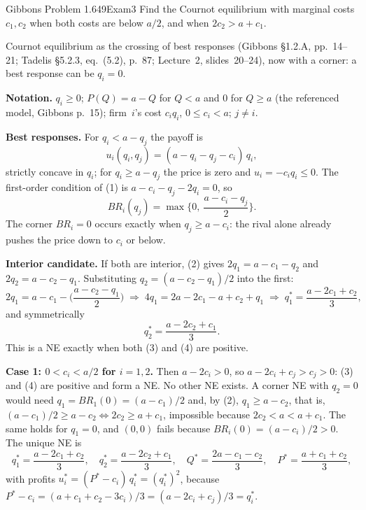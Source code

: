 \begin{exsol}{Gibbons Problem 1.6}{49}{Exam}{3}
\asked Find the Cournot equilibrium with marginal costs $c_1, c_2$ when both costs are below $a/2$, and when $2c_2 > a + c_1$.

\method Cournot equilibrium as the crossing of best responses (Gibbons \S1.2.A, pp.~14--21;
Tadelis \S5.2.3, eq.~(5.2), p.~87; Lecture~2, slides~20--24), now with a corner: a best response
can be $q_i = 0$.

\solution
\textbf{Notation.} $q_i \ge 0$; $P(Q) = a - Q$ for $Q < a$ and $0$ for $Q \ge a$ (the referenced
model, Gibbons p.~15); firm~$i$'s cost $c_i q_i$, $0 \le c_i < a$; $j \ne i$.

\textbf{Best responses.} For $q_i < a - q_j$ the payoff is
\[
  u_i(q_i, q_j) = (a - q_i - q_j - c_i)\,q_i , \tag{1}
\]
strictly concave in $q_i$; for $q_i \ge a - q_j$ the price is zero and $u_i = -c_i q_i \le 0$. The
first-order condition of (1) is $a - c_i - q_j - 2q_i = 0$, so
\[
  BR_i(q_j) = \max\Big\{0,\ \frac{a - c_i - q_j}{2}\Big\}. \tag{2}
\]
The corner $BR_i = 0$ occurs exactly when $q_j \ge a - c_i$: the rival alone already pushes the
price down to $c_i$ or below.

\textbf{Interior candidate.} If both are interior, (2) gives
$2q_1 = a - c_1 - q_2$ and $2q_2 = a - c_2 - q_1$. Substituting $q_2 = (a - c_2 - q_1)/2$ into the
first:
\[
  2q_1 = a - c_1 - \Big(\frac{a - c_2 - q_1}{2}\Big)
  \;\Longrightarrow\; 4q_1 = 2a - 2c_1 - a + c_2 + q_1
  \;\Longrightarrow\; q_1^* = \frac{a - 2c_1 + c_2}{3}, \tag{3}
\]
and symmetrically
\[
  q_2^* = \frac{a - 2c_2 + c_1}{3}. \tag{4}
\]
This is a NE exactly when both (3) and (4) are positive.

\textbf{Case 1: $0 < c_i < a/2$ for $i = 1,2$.} Then $a - 2c_i > 0$, so
$a - 2c_i + c_j > c_j > 0$: (3) and (4) are positive and form a NE. No other NE exists. A corner
NE with $q_2 = 0$ would need $q_1 = BR_1(0) = (a - c_1)/2$ and, by (2), $q_1 \ge a - c_2$, that is,
$(a - c_1)/2 \ge a - c_2 \iff 2c_2 \ge a + c_1$, impossible because $2c_2 < a < a + c_1$. The same
holds for $q_1 = 0$, and $(0,0)$ fails because $BR_i(0) = (a - c_i)/2 > 0$. The unique NE is
\[
  q_1^* = \frac{a - 2c_1 + c_2}{3}, \quad q_2^* = \frac{a - 2c_2 + c_1}{3}, \quad
  Q^* = \frac{2a - c_1 - c_2}{3}, \quad P^* = \frac{a + c_1 + c_2}{3},
\]
with profits $u_i^* = (P^* - c_i)\,q_i^* = (q_i^*)^2$, because
$P^* - c_i = (a + c_1 + c_2 - 3c_i)/3 = (a - 2c_i + c_j)/3 = q_i^*$.


\end{exsol}
